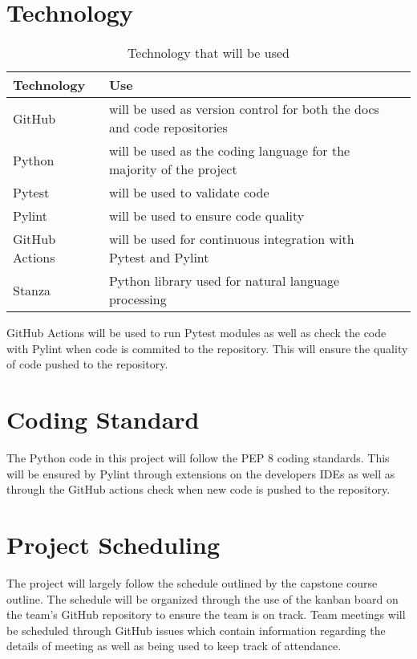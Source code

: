 \documentclass{article}
\begin{document}
\section{Technology}

\begin{table}[hp]
	\caption{Technology that will be used} \label{TblTechnology}
	\begin{tabularx}{\textwidth}{llX}
	\toprule
	\textbf{Technology} & \textbf{Use}\\
	\midrule
	GitHub & will be used as version control for both the docs and code repositories\\
	Python & will be used as the coding language for the majority of the project\\
	Pytest & will be used to validate code\\
	Pylint & will be used to ensure code quality\\
	GitHub Actions & will be used for continuous integration with Pytest and Pylint\\
	Stanza & Python library used for natural language processing\\
	\bottomrule
	\end{tabularx}
\end{table}

GitHub Actions will be used to run Pytest modules as well as check the code with Pylint when code is commited to the repository.
This will ensure the quality of code pushed to the repository.

\section{Coding Standard}

The Python code in this project will follow the PEP 8 coding standards.
This will be ensured by Pylint through extensions on the developers IDEs
as well as through the GitHub actions check when new code is pushed to the repository.

\section{Project Scheduling}

The project will largely follow the schedule outlined by the capstone course outline.
The schedule will be organized through the use of the kanban board on the team's GitHub
repository to ensure the team is on track. Team meetings will be scheduled through GitHub issues
which contain information regarding the details of meeting as well as being used to
keep track of attendance.
\end{document}
